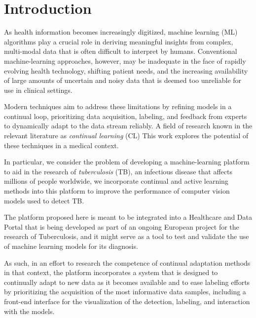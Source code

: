 \documentclass[../main.tex]{subfiles}
\begin{document}
\chapter{Introduction}
\label{chap:intro}

 As health information becomes increasingly digitized, machine learning (ML) algorithms play a crucial role in deriving meaningful insights from complex, multi-modal data that is often difficult to interpret by humans. 
 Conventional machine-learning approaches, however, may be inadequate in the face of rapidly evolving health technology, shifting patient needs, and the increasing availability of large amounts of uncertain and noisy data that is deemed too unreliable for use in clinical settings.

 Modern techniques aim to address these limitations by refining models in a continual loop, prioritizing data acquisition, labeling, and feedback from experts to dynamically adapt to the data stream reliably. A field of research known in the relevant literature as \textit{continual learning} (CL) \cite{parisi_continual_2019} This work explores the potential of these techniques in a medical context. 
 
 In particular, we consider the problem of developing a machine-learning platform to aid in the research of \textit{tuberculosis} (TB), an infectious disease that affects millions of people worldwide, we incorporate continual and active learning methods into this platform to improve the performance of computer vision models used to detect TB.
 
 The platform proposed here is meant to be integrated into a Healthcare and Data Portal that is being developed as part of an ongoing European project for the research of Tuberculosis, and it might serve as a tool to test and validate the use of machine learning models for its diagnosis. 

 As such, in an effort to research the competence of continual adaptation methods in that context, the platform incorporates a system that is designed to continually adapt to new data as it becomes available and to ease labeling efforts by prioritizing the acquisition of the most informative data samples, including a front-end interface for the visualization of the detection, labeling, and interaction with the models.
 
\end{document}
